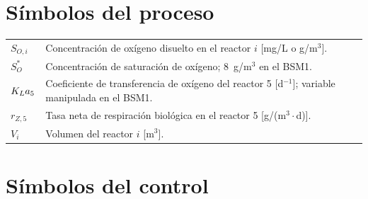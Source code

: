 \section*{Símbolos del proceso}

\begin{longtable}{p{2.6cm}p{12.5cm}}
$S_{O,i}$ & Concentración de oxígeno disuelto en el reactor $i$ [mg/L o g/m$^3$]. \\
$S_O^{*}$ & Concentración de saturación de oxígeno; 8~g/m$^3$ en el BSM1. \\
$K_{L}a_{5}$ & Coeficiente de transferencia de oxígeno del reactor 5 [d$^{-1}$]; variable manipulada en el BSM1. \\
$r_{Z,5}$ & Tasa neta de respiración biológica en el reactor 5 [g/(m$^3\cdot$d)]. \\
$V_i$ & Volumen del reactor $i$ [m$^3$]. \\
\end{longtable}

\section*{Símbolos del control}

